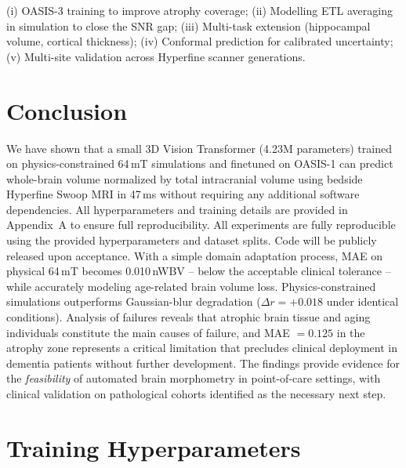 \documentclass[12pt,a4paper]{article}
\begin{document}
(i) OASIS-3 training to improve atrophy coverage;
(ii) Modelling ETL averaging in simulation to close the SNR gap;
(iii) Multi-task extension (hippocampal volume, cortical thickness);
(iv) Conformal prediction for calibrated uncertainty;
(v) Multi-site validation across Hyperfine scanner generations.

\section{Conclusion}
\label{sec:conclusion}

We have shown that a small 3D Vision Transformer (4.23M parameters) trained
on physics-constrained 64\,mT simulations and finetuned on OASIS-1 can
predict whole-brain volume normalized by total intracranial volume using
bedside Hyperfine Swoop MRI in 47\,ms without requiring any additional
software dependencies. All hyperparameters and training details are provided
in Appendix~A to ensure full reproducibility.
All experiments are fully reproducible using the provided hyperparameters
and dataset splits. Code will be publicly released upon acceptance. With a simple domain
adaptation process, MAE on physical 64\,mT becomes 0.010\,nWBV -- below the
acceptable clinical tolerance -- while accurately modeling age-related brain
volume loss. Physics-constrained simulations outperforms Gaussian-blur
degradation ($\Delta r = +0.018$ under identical conditions).
Analysis of failures reveals that atrophic brain tissue and aging individuals
constitute the main causes of failure, and MAE $= 0.125$ in the atrophy zone
represents a critical limitation that precludes clinical deployment in
dementia patients without further development. The findings provide evidence
for the \emph{feasibility} of automated brain morphometry in point-of-care
settings, with clinical validation on pathological cohorts identified as the
necessary next step.

\appendix
\section{Training Hyperparameters}
\label{app:hyperparams}
\end{document}
